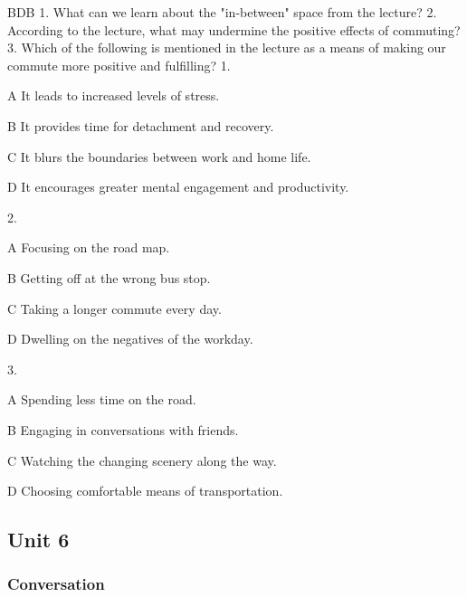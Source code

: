 \begin{enumerate}
	BDB
	1. What can we learn about the "in-between" space from the lecture?
	2. According to the lecture, what may undermine the positive effects of commuting?
	3. Which of the following is mentioned in the lecture as a means of making our commute more positive and fulfilling?
	1.
	
	A
	It leads to increased levels of stress.
	
	B
	It provides time for detachment and recovery.
	
	C
	It blurs the boundaries between work and home life.
	
	D
	It encourages greater mental engagement and productivity.
	
	2.
	
	A
	Focusing on the road map.
	
	B
	Getting off at the wrong bus stop.
	
	C
	Taking a longer commute every day.
	
	D
	Dwelling on the negatives of the workday.
	
	3.
	
	A
	Spending less time on the road.
	
	B
	Engaging in conversations with friends.
	
	C
	Watching the changing scenery along the way.
	
	D
	Choosing comfortable means of transportation.
\end{enumerate}


\newpage
\subsection{Unit 6}

\subsubsection{Conversation}

